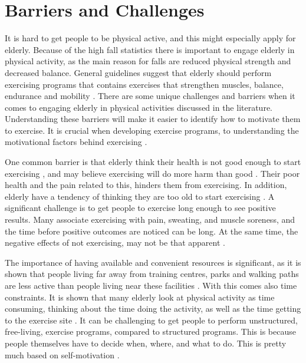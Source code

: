 \section{Barriers and Challenges}
\label{sec:barriers}
It is hard to get people to be physical active, and this might especially apply for elderly. Because of the high fall statistics there is important to engage elderly in physical activity, as the main reason for falls are reduced physical strength and decreased balance. General guidelines suggest that elderly should perform exercising programs that contains exercises that strengthen muscles, balance, endurance and mobility \cite{gruppetrening-trheim}. There are some unique challenges and barriers when it comes to engaging elderly in physical activities discussed in the literature. Understanding these barriers will make it easier to identify how to motivate them to exercise. It is crucial when developing exercise programs, to understanding the motivational factors behind exercising \cite{chao}.

One common barrier is that elderly think their health is not good enough to start exercising \cite{schutzer}, and may believe exercising will do more harm than good \cite{chao}. Their poor health and the pain related to this, hinders them from exercising. In addition, elderly have a tendency of thinking they are too old to start exercising \cite{schutzer}. A significant challenge is to get people to exercise long enough to see positive results. Many associate exercising with pain, sweating, and muscle soreness, and the time before positive outcomes are noticed can be long. At the same time, the negative effects of not exercising, may not be that apparent \cite{chao}. 

The importance of having available and convenient resources is significant, as it is shown that people living far away from training centres, parks and walking paths are less active than people living near these facilities \cite{schutzer}. With this comes also time constraints. It is shown that many elderly look at physical activity as time consuming, thinking about the time doing the activity, as well as the time getting to the exercise site \cite{schutzer} \cite{chao}. It can be challenging to get people to perform unstructured, free-living, exercise programs, compared to structured programs. This is because people themselves have to decide when, where, and what to do. This is pretty much based on self-motivation \cite{chao}.  

